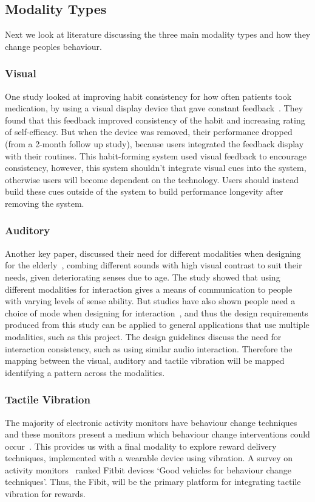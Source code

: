 \subsection{Modality Types}
Next we look at literature discussing the three main modality types and how they change peoples behaviour.

\subsubsection*{Visual}
One study looked at improving habit consistency for how often patients took medication,
by using a visual display device that gave constant feedback~\cite{article_realtime_feedback_improving_medication_taking}.
They found that this feedback improved consistency of the habit and increasing rating of self-efficacy.
But when the device was removed, their performance dropped (from a 2-month follow up study), because users integrated the feedback display with their routines.
This habit-forming system used visual feedback to encourage consistency, however, this system shouldn't integrate visual cues into the system, otherwise users will become dependent on the technology.
Users should instead build these cues outside of the system to build performance longevity after removing the system.

\subsubsection*{Auditory}
Another key paper, discussed their need for different modalities when designing for the elderly~\cite{article_movipill_improving_medication_elders},
combing different sounds with high visual contrast to suit their needs, given deteriorating senses due to age.
The study showed that using different modalities for interaction gives a means of communication to people with varying levels of sense ability.
But studies have also shown people need a choice of mode when designing for interaction~\cite{article_user_centred_multimodal_reminders},
and thus the design requirements produced from this study can be applied to general applications that use multiple modalities, such as this project.
The design guidelines discuss the need for interaction consistency, such as using similar audio interaction.
Therefore the mapping between the visual, auditory and tactile vibration will be mapped identifying a pattern across the modalities.

\subsubsection*{Tactile Vibration}
The majority of electronic activity monitors have behaviour change techniques and these monitors present a medium which behaviour change interventions could occur~\cite{article_wearable_good}.
This provides us with a final modality to explore reward delivery techniques, implemented with a wearable device using vibration.
A survey on activity monitors~\cite{article_wearable_good} ranked Fitbit devices `Good vehicles for behaviour change techniques'.
Thus, the Fibit, will be the primary platform for integrating tactile vibration for rewards.

